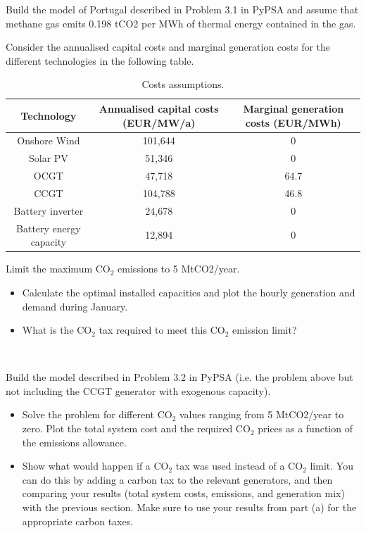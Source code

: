 \documentclass[10pt]{article}
\newenvironment{problem}[2][Problem]{\begin{trivlist}
\item[\hskip \labelsep {\bfseries #1}\hskip \labelsep {\bfseries #2.}]}{\end{trivlist}}
\begin{document}
\begin{problem}{9.2}
Build the model of Portugal described in Problem 3.1 in PyPSA and assume that methane gas emits 0.198 tCO2 per MWh of thermal energy contained in the gas. 

Consider the annualised capital costs and marginal generation costs for the different technologies in the following table.

\begin{table}[h]
    \centering
    \begin{tabular}{|c|c|c|}
    \hline
        Technology & Annualised capital costs (EUR/MW/a) & Marginal generation costs (EUR/MWh) \\
    \hline
    	Onshore Wind &  101,644 & 0 \\
         Solar PV &  51,346 & 0 \\
         OCGT & 47,718 &  64.7  \\
         CCGT & 104,788 &  46.8   \\
         Battery inverter &  24,678 & 0 \\
         Battery energy capacity &  12,894 & 0 \\
    \hline
    \end{tabular}
    \caption{Costs assumptions.}
    \label{tab:my_label}
\end{table}

Limit the maximum CO$_2$ emissions to 5 MtCO2/year. 

\begin{itemize}
\item[a)] Calculate the optimal installed capacities and plot the hourly generation and demand during January.
\item[b)] What is the CO$_2$ tax required to meet this CO$_2$ emission limit?

\end{itemize}

\end{problem}

\

\begin{problem}{9.3}

Build the model described in Problem 3.2 in PyPSA (i.e. the problem above but not including the CCGT generator with exogenous capacity).

\begin{itemize}
	\item[a)] Solve the problem for different CO$_2$ values ranging from 5 MtCO2/year to zero. Plot the total system cost and the required CO$_2$ prices as a function of the emissions allowance.
	\item[b)] Show what would happen if a CO$_2$ tax was used instead of a CO$_2$ limit. You can do this by adding a carbon tax to the relevant generators, and then comparing your results (total system costs, emissions, and generation mix) with the previous section. Make sure to use your results from part (a) for the appropriate carbon taxes.
\end{itemize}



\end{problem}

\end{document}
